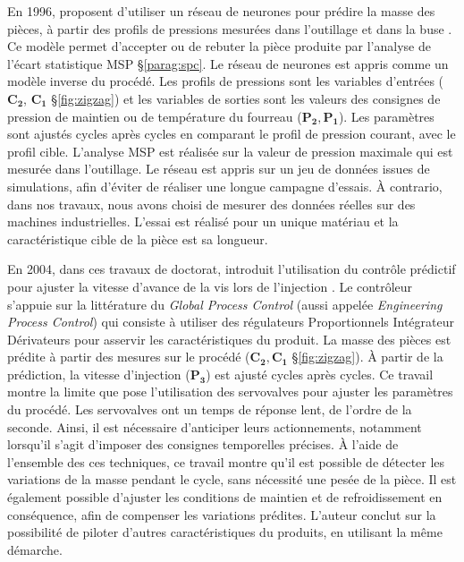 En 1996, \citeauthor{woll_online_1996} proposent d'utiliser un réseau de neurones pour prédire la masse des pièces, à partir des profils de pressions mesurées dans l'outillage et dans la buse \cite{woll_online_1996}.
Ce modèle permet d'accepter ou de rebuter la pièce produite par l'analyse de l'écart statistique MSP §\ref{parag:spc}.
Le réseau de neurones est appris comme un modèle inverse du procédé.
Les profils de pressions sont les variables d'entrées ($\boldsymbol{C_2}$, $\boldsymbol{C_1}$ §\ref{fig:zigzag}) et les variables de sorties sont les valeurs des consignes de pression de maintien ou de température du fourreau ($\boldsymbol{P_2, P_1}$).
Les paramètres sont ajustés cycles après cycles en comparant le profil de pression courant, avec le profil cible.
L'analyse MSP est réalisée sur la valeur de pression maximale qui est mesurée dans l'outillage.
Le réseau est appris sur un jeu de données issues de simulations, afin d'éviter de réaliser une longue campagne d'essais.
À contrario, dans nos travaux, nous avons choisi de mesurer des données réelles sur des machines industrielles.
L'essai est réalisé pour un unique matériau et la caractéristique cible de la pièce est sa longueur.

En 2004, dans ces travaux de doctorat, \citeauthor{yang_injection_2004} introduit l'utilisation du contrôle prédictif pour ajuster la vitesse d'avance de la vis lors de l'injection \cite{yang_injection_2004}.
Le contrôleur s'appuie sur la littérature du \textit{Global Process Control} (aussi appelée \textit{Engineering Process Control}) qui consiste à utiliser des régulateurs Proportionnels Intégrateur Dérivateurs pour asservir les caractéristiques du produit.
La masse des pièces est prédite à partir des mesures sur le procédé ($\boldsymbol{C_2, C_1}$ §\ref{fig:zigzag}).
À partir de la prédiction, la vitesse d'injection ($\boldsymbol{P_3}$) est ajusté cycles après cycles.
Ce travail montre la limite que pose l'utilisation des servovalves pour ajuster les paramètres du procédé.
Les servovalves ont un temps de réponse lent, de l'ordre de la seconde.
Ainsi, il est nécessaire d'anticiper leurs actionnements, notamment lorsqu'il s'agit d'imposer des consignes temporelles précises.
À l'aide de l'ensemble des ces techniques, ce travail montre qu'il est possible de détecter les variations de la masse pendant le cycle, sans nécessité une pesée de la pièce.
Il est également possible d'ajuster les conditions de maintien et de refroidissement en conséquence, afin de compenser les variations prédites.
L'auteur conclut sur la possibilité de piloter d'autres caractéristiques du produits, en utilisant la même démarche.

